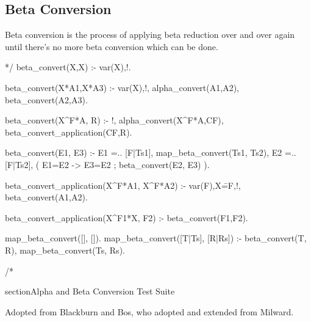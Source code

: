 \documentclass{book}[9pt]
\newenvironment{code}%
{\small \verbatim}%
{\endverbatim \large}
\begin{document}
\subsection{Beta Conversion}

Beta conversion is the process of applying beta reduction over and
over again until there's no more beta conversion which can be done.

\begin{code}

*/
beta_convert(X,X) :- var(X),!.

beta_convert(X*A1,X*A3) :- var(X),!,
        alpha_convert(A1,A2),
        beta_convert(A2,A3).

beta_convert(X^F*A, R) :- !,
        alpha_convert(X^F*A,CF),
        beta_convert_application(CF,R).

beta_convert(E1, E3) :-
        E1 =.. [F|Ts1],
        map_beta_convert(Ts1, Ts2),
        E2 =..[F|Ts2],
        ( \+ \+ E1=E2
        -> E3=E2
        ; beta_convert(E2, E3)
        ).

beta_convert_application(X^F*A1, X^F*A2) :- var(F),X\==F,!,
        beta_convert(A1,A2).

beta_convert_application(X^F1*X, F2) :-
        beta_convert(F1,F2).

map_beta_convert([], []).
map_beta_convert([T|Ts], [R|Rs]) :-
        beta_convert(T, R),
        map_beta_convert(Ts, Rs).

/*
\end{code}

section{Alpha and Beta Conversion Test Suite}

Adopted from Blackburn and Bos, who adopted and extended
from Milward.
\end{document}
